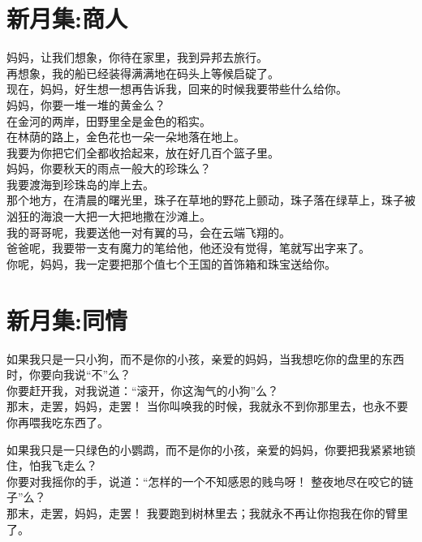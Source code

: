 \documentclass[
]{book}
\renewenvironment{quote}{\begin{VF}}{\end{VF}}
\begin{document}
\hypertarget{section-46}{%
\section{新月集:商人}\label{section-46}}

\begin{quote}
妈妈，让我们想象，你待在家里，我到异邦去旅行。\\
再想象，我的船已经装得满满地在码头上等候启碇了。\\
现在，妈妈，好生想一想再告诉我，回来的时候我要带些什么给你。\\
妈妈，你要一堆一堆的黄金么？\\
在金河的两岸，田野里全是金色的稻实。\\
在林荫的路上，金色花也一朵一朵地落在地上。\\
我要为你把它们全都收拾起来，放在好几百个篮子里。\\
妈妈，你要秋天的雨点一般大的珍珠么？\\
我要渡海到珍珠岛的岸上去。\\
那个地方，在清晨的曙光里，珠子在草地的野花上颤动，珠子落在绿草上，珠子被汹狂的海浪一大把一大把地撒在沙滩上。\\
我的哥哥呢，我要送他一对有翼的马，会在云端飞翔的。\\
爸爸呢，我要带一支有魔力的笔给他，他还没有觉得，笔就写出字来了。\\
你呢，妈妈，我一定要把那个值七个王国的首饰箱和珠宝送给你。
\end{quote}

\hypertarget{section-47}{%
\section{新月集:同情}\label{section-47}}

\begin{quote}
如果我只是一只小狗，而不是你的小孩，亲爱的妈妈，当我想吃你的盘里的东西时，你要向我说``不''么？\\
你要赶开我，对我说道：``滚开，你这淘气的小狗''么？\\
那末，走罢，妈妈，走罢！ 当你叫唤我的时候，我就永不到你那里去，也永不要你再喂我吃东西了。

如果我只是一只绿色的小鹦鹉，而不是你的小孩，亲爱的妈妈，你要把我紧紧地锁住，怕我飞走么？\\
你要对我摇你的手，说道：``怎样的一个不知感恩的贱鸟呀！ 整夜地尽在咬它的链子''么？\\
那末，走罢，妈妈，走罢！ 我要跑到树林里去；我就永不再让你抱我在你的臂里了。
\end{quote}
\end{document}
